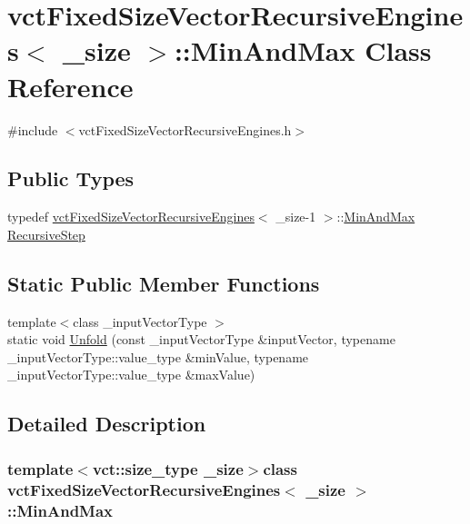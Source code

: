 \hypertarget{classvct_fixed_size_vector_recursive_engines_1_1_min_and_max}{}\section{vct\+Fixed\+Size\+Vector\+Recursive\+Engines$<$ \+\_\+size $>$\+:\+:Min\+And\+Max Class Reference}
\label{classvct_fixed_size_vector_recursive_engines_1_1_min_and_max}


{\ttfamily \#include $<$vct\+Fixed\+Size\+Vector\+Recursive\+Engines.\+h$>$}

\subsection*{Public Types}
\begin{DoxyCompactItemize}
\item 
typedef \hyperlink{classvct_fixed_size_vector_recursive_engines}{vct\+Fixed\+Size\+Vector\+Recursive\+Engines}$<$ \+\_\+size-\/1 $>$\+::\hyperlink{classvct_fixed_size_vector_recursive_engines_1_1_min_and_max}{Min\+And\+Max} \hyperlink{classvct_fixed_size_vector_recursive_engines_1_1_min_and_max_a8a55b88dff723ad7810e37575e2fb00c}{Recursive\+Step}
\end{DoxyCompactItemize}
\subsection*{Static Public Member Functions}
\begin{DoxyCompactItemize}
\item 
{\footnotesize template$<$class \+\_\+input\+Vector\+Type $>$ }\\static void \hyperlink{classvct_fixed_size_vector_recursive_engines_1_1_min_and_max_a57f3006079513691792be72760899980}{Unfold} (const \+\_\+input\+Vector\+Type \&input\+Vector, typename \+\_\+input\+Vector\+Type\+::value\+\_\+type \&min\+Value, typename \+\_\+input\+Vector\+Type\+::value\+\_\+type \&max\+Value)
\end{DoxyCompactItemize}


\subsection{Detailed Description}
\subsubsection*{template$<$vct\+::size\+\_\+type \+\_\+size$>$class vct\+Fixed\+Size\+Vector\+Recursive\+Engines$<$ \+\_\+size $>$\+::\+Min\+And\+Max}

